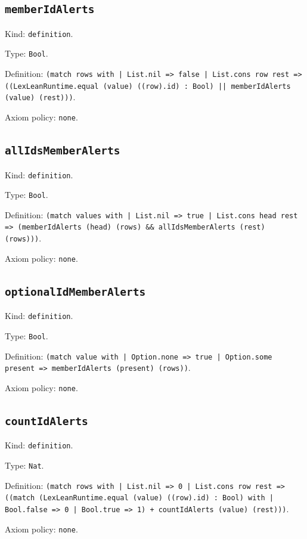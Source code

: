 \documentclass[11pt]{article}
\begin{document}
\subsection*{\texttt{memberIdAlerts}}
\noindent Kind: \texttt{definition}.\par
\noindent Type: \texttt{Bool}.\par
\noindent Definition: \texttt{(match rows with | List.nil => false | List.cons row rest => ((LexLeanRuntime.equal (value) ((row).id) : Bool) || memberIdAlerts (value) (rest)))}.\par
\noindent Axiom policy: \texttt{none}.\par
\subsection*{\texttt{allIdsMemberAlerts}}
\noindent Kind: \texttt{definition}.\par
\noindent Type: \texttt{Bool}.\par
\noindent Definition: \texttt{(match values with | List.nil => true | List.cons head rest => (memberIdAlerts (head) (rows) \&\& allIdsMemberAlerts (rest) (rows)))}.\par
\noindent Axiom policy: \texttt{none}.\par
\subsection*{\texttt{optionalIdMemberAlerts}}
\noindent Kind: \texttt{definition}.\par
\noindent Type: \texttt{Bool}.\par
\noindent Definition: \texttt{(match value with | Option.none => true | Option.some present => memberIdAlerts (present) (rows))}.\par
\noindent Axiom policy: \texttt{none}.\par
\subsection*{\texttt{countIdAlerts}}
\noindent Kind: \texttt{definition}.\par
\noindent Type: \texttt{Nat}.\par
\noindent Definition: \texttt{(match rows with | List.nil => 0 | List.cons row rest => ((match (LexLeanRuntime.equal (value) ((row).id) : Bool) with | Bool.false => 0 | Bool.true => 1) + countIdAlerts (value) (rest)))}.\par
\noindent Axiom policy: \texttt{none}.\par
\end{document}
